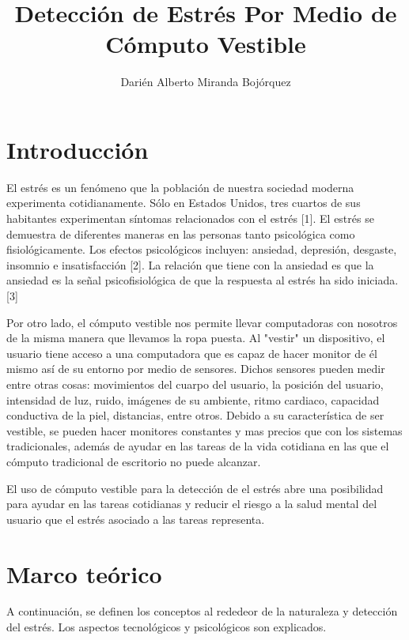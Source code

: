 \documentclass[letterpaper,12pt]{cicese}
\begin{document}
	\doublespace
	\title{Detecci\'on de Estr\'es Por Medio de C\'omputo Vestible}
	\author{Dari\'en Alberto Miranda Boj\'orquez}
	\maketitle
	\newpage
	\tableofcontents
	\newpage

		\chapter{Introducci\'on} 
			El estr\'es es un fen\'omeno que la poblaci\'on de nuestra sociedad moderna experimenta cotidianamente. S\'olo en Estados Unidos, tres cuartos de sus
			habitantes experimentan s\'intomas relacionados con el estr\'es [1]. El estr\'es se demuestra de diferentes maneras en las personas tanto psicol\'ogica
			como fisiol\'ogicamente. Los efectos psicol\'ogicos incluyen: ansiedad, depresi\'on, desgaste, insomnio e insatisfacci\'on [2]. La relaci\'on que tiene
			con la ansiedad es que la ansiedad es la se\~nal psicofisiol\'ogica de que la respuesta al estr\'es ha sido iniciada.[3]
			
			Por otro lado, el c\'omputo vestible nos permite llevar computadoras con nosotros de la misma manera que llevamos la ropa puesta. Al "vestir" un dispositivo,
			el usuario tiene acceso a una computadora que es capaz de hacer monitor de \'el mismo as\'i de su entorno por medio de sensores. Dichos sensores pueden medir entre
			otras cosas: movimientos del cuarpo del usuario, la posici\'on del usuario, intensidad de luz, ruido, im\'agenes de su ambiente, ritmo cardiaco, capacidad
			conductiva de la piel, distancias, entre otros. Debido a su caracter\'istica de ser vestible, se pueden hacer monitores constantes y mas precios que con
			los sistemas tradicionales, adem\'as de ayudar en las tareas de la vida cotidiana en las que el c\'omputo tradicional de escritorio no puede alcanzar.
			
			El uso de c\'omputo vestible para la detecci\'on de el estr\'es abre una posibilidad para ayudar en las tareas cotidianas y reducir el riesgo a la salud mental
			del usuario que el estr\'es asociado a las tareas representa.
		\chapter{Marco te\'orico} 
			A continuaci\'on, se definen los conceptos al rededeor de la naturaleza y detecci\'on del estr\'es. Los aspectos tecnol\'ogicos y psicol\'ogicos son explicados.
\end{document}
